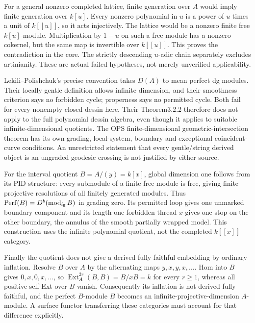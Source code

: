 \documentclass[11pt,oneside,openany]{book}
\theoremstyle{definition}\newtheorem{definition}[theorem]{Definition}
\theoremstyle{remark}\newtheorem{remark}[theorem]{Remark}
\begin{document}
For a general nonzero completed lattice, finite generation over $A$ would imply finite generation over $k[u]$. Every nonzero polynomial in $u$ is a power of $u$ times a unit of $k[[u]]$, so it acts injectively. The lattice would be a nonzero finite free $k[u]$-module. Multiplication by $1-u$ on such a free module has a nonzero cokernel, but the same map is invertible over $k[[u]]$. This proves the contradiction in the core. The strictly descending $u$-adic chain separately excludes artinianity. These are actual failed hypotheses, not merely unverified applicability.

Lekili--Polishchuk's precise convention takes $D(A)$ to mean perfect dg modules. Their locally gentle definition allows infinite dimension, and their smoothness criterion says no forbidden cycle; properness says no permitted cycle. Both fail for every nonempty closed dessin here. Their Theorem3.2.2 therefore does not apply to the full polynomial dessin algebra, even though it applies to suitable infinite-dimensional quotients. The OPS finite-dimensional geometric-intersection theorem has its own grading, local-system, boundary and exceptional coincident-curve conditions. An unrestricted statement that every gentle/string derived object is an ungraded geodesic crossing is not justified by either source.

For the interval quotient $B=A/(y)=k[x]$, global dimension one follows from its PID structure: every submodule of a finite free module is free, giving finite projective resolutions of all finitely generated modules. Thus $\operatorname{Perf}(B)=D^b(\operatorname{mod}_{\rm fg}B)$ in grading zero. Its permitted loop gives one unmarked boundary component and its length-one forbidden thread $x$ gives one stop on the other boundary, the annulus of the smooth partially wrapped model. This construction uses the infinite polynomial quotient, not the completed $k[[x]]$ category.

Finally the quotient does not give a derived fully faithful embedding by ordinary inflation. Resolve $B$ over $A$ by the alternating maps $y,x,y,x,\ldots$. Hom into $B$ gives $0,x,0,x,\ldots$, so $\operatorname{Ext}_A^{2r}(B,B)=B/xB=k$ for every $r\ge1$, whereas all positive self-Ext over $B$ vanish. Consequently its inflation is not derived fully faithful, and the perfect $B$-module $B$ becomes an infinite-projective-dimension $A$-module. A surface functor transferring these categories must account for that difference explicitly.
\end{document}
